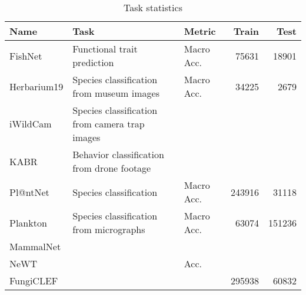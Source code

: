\documentclass{article}
\begin{document}
\begin{table}[t]
    \centering
    \small
    \begin{tabular}{lllrr}
        \toprule
        Name & Task & Metric & Train & Test\\
        \midrule
        FishNet \citep{khan2023fishnet} & Functional trait prediction & Macro Acc. & \num{75631} & \num{18901} \\
        Herbarium19 \citep{tan2019herbarium19} & Species classification from museum images & Macro Acc. & \num{34225} & \num{2679} \\
        iWildCam \citep{iwildcam} & Species classification from camera trap images \\
        KABR \citep{kabr} & Behavior classification from drone footage & \\
        Pl@ntNet \citep{garcin2021plantnet300k} & Species classification & Macro Acc. & \num{243916} & \num{31118} \\
        Plankton \citep{plankton} & Species classification from micrographs & Macro Acc. & \num{63074} & \num{151236} \\
        MammalNet \citep{mammalnet} \\
        NeWT \cite{newt} & & Acc. \\
        FungiCLEF \cite{fungiclef} & & & \num{295938} & \num{60832} \\
        \bottomrule
    \end{tabular}
    \caption{Task statistics}
    \label{tab:task-stats}
\end{table}
\end{document}
